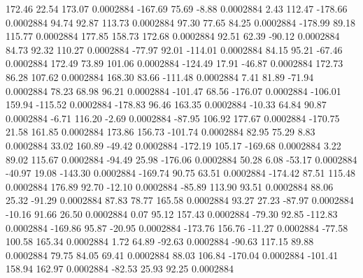       172.46       22.54      173.07     0.0002884
     -167.69       75.69       -8.88     0.0002884
        2.43      112.47     -178.66     0.0002884
       94.74       92.87      113.73     0.0002884
       97.30       77.65       84.25     0.0002884
     -178.99       89.18      115.77     0.0002884
      177.85      158.73      172.68     0.0002884
       92.51       62.39      -90.12     0.0002884
       84.73       92.32      110.27     0.0002884
      -77.97       92.01     -114.01     0.0002884
       84.15       95.21      -67.46     0.0002884
      172.49       73.89      101.06     0.0002884
     -124.49       17.91      -46.87     0.0002884
      172.73       86.28      107.62     0.0002884
      168.30       83.66     -111.48     0.0002884
        7.41       81.89      -71.94     0.0002884
       78.23       68.98       96.21     0.0002884
     -101.47       68.56     -176.07     0.0002884
     -106.01      159.94     -115.52     0.0002884
     -178.83       96.46      163.35     0.0002884
      -10.33       64.84       90.87     0.0002884
       -6.71      116.20       -2.69     0.0002884
      -87.95      106.92      177.67     0.0002884
     -170.75       21.58      161.85     0.0002884
      173.86      156.73     -101.74     0.0002884
       82.95       75.29        8.83     0.0002884
       33.02      160.89      -49.42     0.0002884
     -172.19      105.17     -169.68     0.0002884
        3.22       89.02      115.67     0.0002884
      -94.49       25.98     -176.06     0.0002884
       50.28        6.08      -53.17     0.0002884
      -40.97       19.08     -143.30     0.0002884
     -169.74       90.75       63.51     0.0002884
     -174.42       87.51      115.48     0.0002884
      176.89       92.70      -12.10     0.0002884
      -85.89      113.90       93.51     0.0002884
       88.06       25.32      -91.29     0.0002884
       87.83       78.77      165.58     0.0002884
       93.27       27.23      -87.97     0.0002884
      -10.16       91.66       26.50     0.0002884
        0.07       95.12      157.43     0.0002884
      -79.30       92.85     -112.83     0.0002884
     -169.86       95.87      -20.95     0.0002884
     -173.76      156.76      -11.27     0.0002884
      -77.58      100.58      165.34     0.0002884
        1.72       64.89      -92.63     0.0002884
      -90.63      117.15       89.88     0.0002884
       79.75       84.05       69.41     0.0002884
       88.03      106.84     -170.04     0.0002884
     -101.41      158.94      162.97     0.0002884
      -82.53       25.93       92.25     0.0002884

